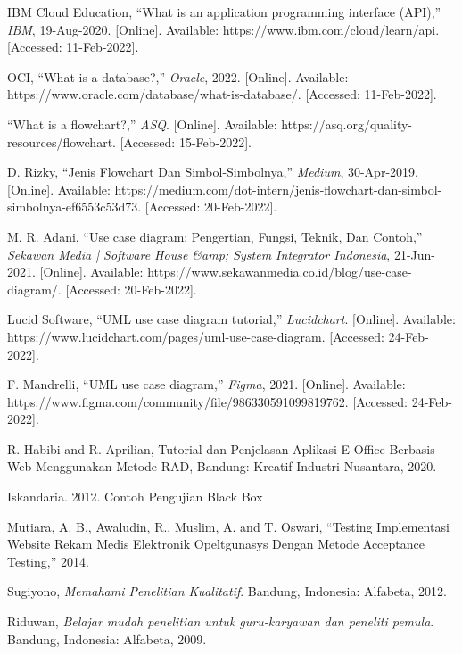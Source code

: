 \begin{thebibliography}{7}
IBM Cloud Education, “What is an application programming interface (API),” \emph{IBM}, 19-Aug-2020. [Online]. Available: https://www.ibm.com/cloud/learn/api. [Accessed: 11-Feb-2022]. 

OCI, “What is a database?,” \emph{Oracle}, 2022. [Online]. Available: https://www.oracle.com/database/what-is-database/. [Accessed: 11-Feb-2022]. 

“What is a flowchart?,” \emph{ASQ}. [Online]. Available: https://asq.org/quality-resources/flowchart. [Accessed: 15-Feb-2022]. 

D. Rizky, “Jenis Flowchart Dan Simbol-Simbolnya,” \emph{Medium}, 30-Apr-2019. [Online]. Available: https://medium.com/dot-intern/jenis-flowchart-dan-simbol-simbolnya-ef6553c53d73. [Accessed: 20-Feb-2022]. 

M. R. Adani, “Use case diagram: Pengertian, Fungsi, Teknik, Dan Contoh,” \emph{Sekawan Media | Software House \&amp; System Integrator Indonesia}, 21-Jun-2021. [Online]. Available: https://www.sekawanmedia.co.id/blog/use-case-diagram/. [Accessed: 20-Feb-2022]. 

Lucid Software, “UML use case diagram tutorial,” \emph{Lucidchart}. [Online]. Available: https://www.lucidchart.com/pages/uml-use-case-diagram. [Accessed: 24-Feb-2022]. 

F. Mandrelli, “UML use case diagram,” \emph{Figma}, 2021. [Online]. Available: https://www.figma.com/community/file/986330591099819762. [Accessed: 24-Feb-2022]. 

R.   Habibi   and   R.   Aprilian,   Tutorial   dan Penjelasan  Aplikasi  E-Office  Berbasis  Web Menggunakan Metode RAD, Bandung: Kreatif Industri Nusantara, 2020. 

Iskandaria. 2012. Contoh Pengujian Black Box

Mutiara, A. B., Awaludin, R., Muslim, A. and T. Oswari, “Testing Implementasi Website Rekam Medis Elektronik Opeltgunasys Dengan Metode Acceptance Testing,” 2014.

Sugiyono, \emph{Memahami Penelitian Kualitatif}. Bandung, Indonesia: Alfabeta, 2012.

Riduwan, \emph{Belajar mudah penelitian untuk guru-karyawan dan peneliti pemula}. Bandung, Indonesia: Alfabeta, 2009. 


\end{thebibliography}

